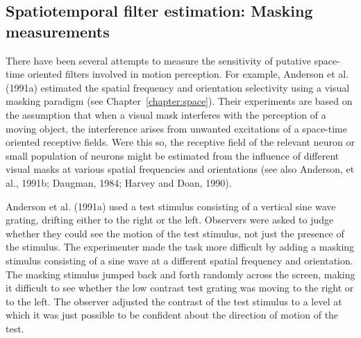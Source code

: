 \subsection*{Spatiotemporal filter estimation:  Masking measurements}

There have been several attempts to measure the sensitivity of
putative space-time oriented filters involved in motion perception.
For example, Anderson et al. (1991a) estimated the spatial frequency
and orientation selectivity using a visual masking paradigm (see
Chapter~\ref{chapter:space}).  Their experiments are based on the
assumption that when a visual mask interferes with the perception of a
moving object, the interference arises from unwanted excitations of a
space-time oriented receptive fields.  Were this so, the receptive
field of the relevant neuron or small population of neurons might be
estimated from the influence of different visual masks at various
spatial frequencies and orientations (see also Anderson, et al.,
1991b; Daugman, 1984; Harvey and Doan, 1990).

Anderson et al. (1991a) used a test stimulus consisting of a vertical sine
wave grating, drifting either to the right or the left.  Observers
were asked to judge whether they could see the motion of the test
stimulus, not just the presence of the stimulus.  The experimenter
made the task more difficult by adding a masking stimulus consisting
of a sine wave at a different spatial frequency and orientation.  The
masking stimulus jumped back and forth randomly across the screen,
making it difficult to see whether the low contrast test grating was
moving to the right or to the left.  The observer adjusted the
contrast of the test stimulus to a level at which it was just possible
to be confident about the direction of motion of the test.

